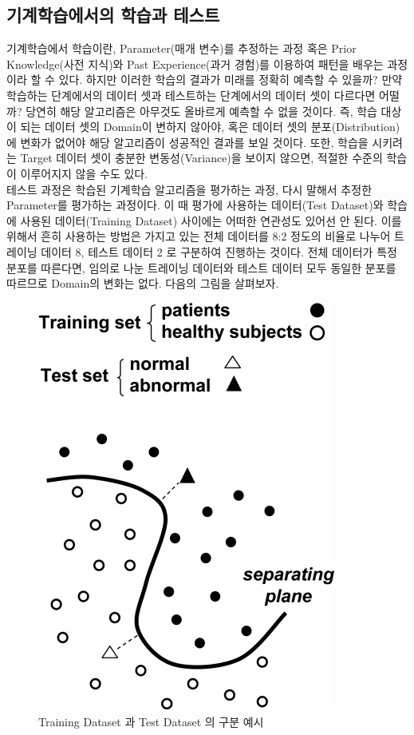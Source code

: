 \documentclass[a4paper]{oblivoir}
\begin{document}
\subsection{기계학습에서의 학습과 테스트}
기계학습에서 학습이란, Parameter(매개 변수)를 추정하는 과정 혹은 Prior Knowledge(사전 지식)와 Past Experience(과거 경험)를 이용하여 패턴을 배우는 과정이라 할 수 있다. 하지만 이러한 학습의 결과가 미래를 정확히 예측할 수 있을까? 만약 학습하는 단계에서의 데이터 셋과 테스트하는 단계에서의 데이터 셋이 다르다면 어떨까? 당연히 해당 알고리즘은 아무것도 올바르게 예측할 수 없을 것이다. 즉, 학습 대상이 되는 데이터 셋의 Domain이 변하지 않아야, 혹은 데이터 셋의 분포(Distribution)에 변화가 없어야 해당 알고리즘이 성공적인 결과를 보일 것이다. 또한, 학습을 시키려는 Target 데이터 셋이 충분한 변동성(Variance)을 보이지 않으면, 적절한 수준의 학습이 이루어지지 않을 수도 있다. \\
\indent 테스트 과정은 학습된 기계학습 알고리즘을 평가하는 과정, 다시 말해서 추정한 Parameter를 평가하는 과정이다. 이 때 평가에 사용하는 데이터(Test Dataset)와 학습에 사용된 데이터(Training Dataset) 사이에는 어떠한 연관성도 있어선 안 된다. 이를 위해서 흔히 사용하는 방법은 가지고 있는 전체 데이터를 8:2 정도의 비율로 나누어 트레이닝 데이터 8, 테스트 데이터 2 로 구분하여 진행하는 것이다. 전체 데이터가 특정 분포를 따른다면, 임의로 나눈 트레이닝 데이터와 테스트 데이터 모두 동일한 분포를 따르므로 Domain의 변화는 없다. 다음의 그림을 살펴보자.
\begin{figure}[ht]
\centering
\includegraphics[scale=0.5]{Training_&_Testing.png}
\caption{Training Dataset 과 Test Dataset 의 구분 예시}
\label{Figure 6-1}
\end{figure}
\end{document}

